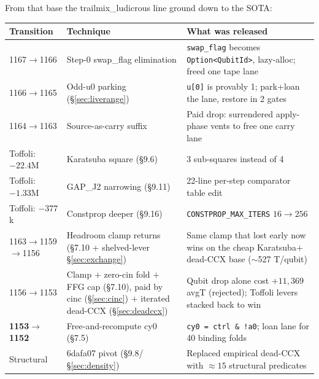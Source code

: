 \documentclass[11pt,a4paper]{article}
\begin{document}
From that base the trailmix\_ludicrous line ground down to the SOTA:

\begin{center}
\begin{tabular}{p{3.8cm}p{4.5cm}p{5.2cm}}
\toprule
\textbf{Transition} & \textbf{Technique} & \textbf{What was released} \\
\midrule
1167$\to$1166 & Step-0 swap\_flag elimination & \texttt{swap\_flag} becomes \texttt{Option<QubitId>}, lazy-alloc; freed one tape lane \\
1166$\to$1165 & Odd-u0 parking (\S\ref{sec:liverange}) & \texttt{u[0]} is provably 1; park+loan the lane, restore in 2 gates \\
1164$\to$1163 & Source-as-carry suffix & Paid drop: surrendered apply-phase vents to free one carry lane \\
Toffoli: $-22.4$M & Karatsuba square (\S9.6) & 3 sub-squares instead of 4 \\
Toffoli: $-1.33$M & GAP\_J2 narrowing (\S9.11) & 22-line per-step comparator table edit \\
Toffoli: $-377$k & Constprop deeper (\S9.16) & \texttt{CONSTPROP\_MAX\_ITERS} $16\to256$ \\
1163$\to$1159$\to$1156 & Headroom clamp returns (\S7.10 + shelved-lever \S\ref{sec:exchange}) & Same clamp that lost early now wins on the cheap Karatsuba$+$dead-CCX base ($\sim$527 T/qubit) \\
1156$\to$1153 & Clamp $+$ zero-cin fold $+$ FFG cap (\S7.10), paid by cinc (\S\ref{sec:cinc}) $+$ iterated dead-CCX (\S\ref{sec:deadccx}) & Qubit drop alone cost $+11{,}369$ avgT (rejected); Toffoli levers stacked back to win \\
\textbf{1153$\to$1152} & Free-and-recompute cy0 (\S7.5) & \texttt{cy0 = ctrl \& !a0}; loan lane for 40 binding folds \\
Structural & 6dafa07 pivot (\S9.8/\S\ref{sec:density}) & Replaced empirical dead-CCX with $\approx15$ structural predicates \\
\bottomrule
\end{tabular}
\end{center}
\end{document}
